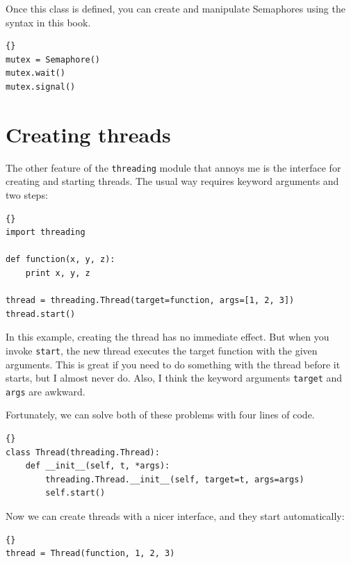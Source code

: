 \documentclass{book}
\begin{document}
Once this class is defined, you can create and manipulate Semaphores
using the syntax in this book.

\begin{latin}
\begin{lstlisting}[title={Semaphore example}]{}
mutex = Semaphore()
mutex.wait()
mutex.signal()
\end{lstlisting}
\end{latin}

\section{Creating threads}

The other feature of the {\tt threading} module that annoys
me is the interface for creating and starting threads.  The
usual way requires keyword arguments and two steps:

\begin{latin}
\begin{lstlisting}[title={Thread example (standard way)}]{}
import threading

def function(x, y, z):
    print x, y, z

thread = threading.Thread(target=function, args=[1, 2, 3])
thread.start()
\end{lstlisting}
\end{latin}

In this example, creating the thread has no immediate effect.
But when you invoke {\tt start}, the new thread executes
the target function with the given arguments.
This is great if you need to do something with the thread
before it starts, but I almost never do.
Also, I think the keyword arguments {\tt target} and {\tt args}
are awkward.

Fortunately, we can solve both of these problems with four
lines of code.

\begin{latin}
\begin{lstlisting}[title={Cleaned-up Thread class}]{}
class Thread(threading.Thread):
    def __init__(self, t, *args):
        threading.Thread.__init__(self, target=t, args=args)
        self.start()
\end{lstlisting}
\end{latin}

Now we can create threads with a nicer interface, and they
start automatically:

\begin{latin}
\begin{lstlisting}[title={Thread example (my way)}]{}
thread = Thread(function, 1, 2, 3)
\end{lstlisting}
\end{latin}
\end{document}
